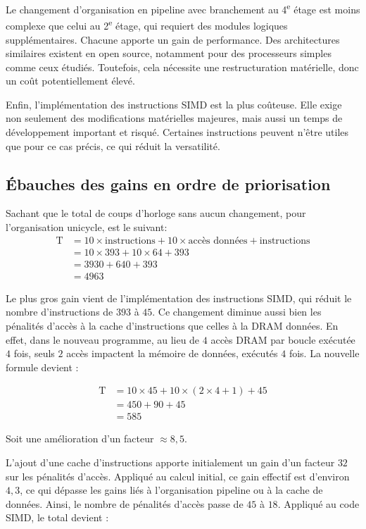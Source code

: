 \documentclass[a11paper]{article}
\begin{document}
Le changement d’organisation en pipeline avec branchement au 4\textsuperscript{e} étage est moins
complexe que celui au 2\textsuperscript{e} étage, qui requiert des modules logiques supplémentaires.
Chacune apporte un gain de performance. Des architectures similaires existent en
open source, notamment pour des processeurs simples comme ceux étudiés. Toutefois,
cela nécessite une restructuration matérielle, donc un coût potentiellement élevé.

Enfin, l’implémentation des instructions SIMD est la plus coûteuse. Elle exige
non seulement des modifications matérielles majeures, mais aussi un temps de
développement important et risqué. Certaines instructions peuvent n’être utiles
que pour ce cas précis, ce qui réduit la versatilité.

\subsection{Ébauches des gains en ordre de priorisation}
Sachant que le total de coups d'horloge sans aucun changement, pour
l'organisation unicycle, est le suivant:
\begin{align}
  \text{T} &= 10 \times \text{instructions} + 10 \times \text{accès données} + \text{instructions} \\
  &= 10 \times 393 + 10 \times 64 + 393 \\
  &= 3930 + 640 + 393 \\
  &= 4963
\end{align}

Le plus gros gain vient de l’implémentation des instructions SIMD, qui réduit
le nombre d’instructions de $393$ à $45$. Ce changement diminue aussi bien les
pénalités d’accès à la cache d’instructions que celles à la DRAM données.
En effet, dans le nouveau programme, au lieu de $4$ accès DRAM par boucle exécutée
$4$ fois, seuls $2$ accès impactent la mémoire de données, exécutés $4$ fois.
La nouvelle formule devient :

\begin{align}
  \text{T} &= 10 \times 45 + 10 \times (2 \times 4 + 1) + 45 \\
  &= 450 + 90 + 45 \\
  &= 585
\end{align}

Soit une amélioration d’un facteur $\approx 8{,}5$.

L’ajout d’une cache d’instructions apporte initialement un gain d’un facteur $32$
sur les pénalités d’accès. Appliqué au calcul initial, ce gain effectif est
d’environ $4{,}3$, ce qui dépasse les gains liés à l’organisation pipeline ou
à la cache de données. Ainsi, le nombre de pénalités d’accès passe de $45$ à $18$.
Appliqué au code SIMD, le total devient :
\end{document}
